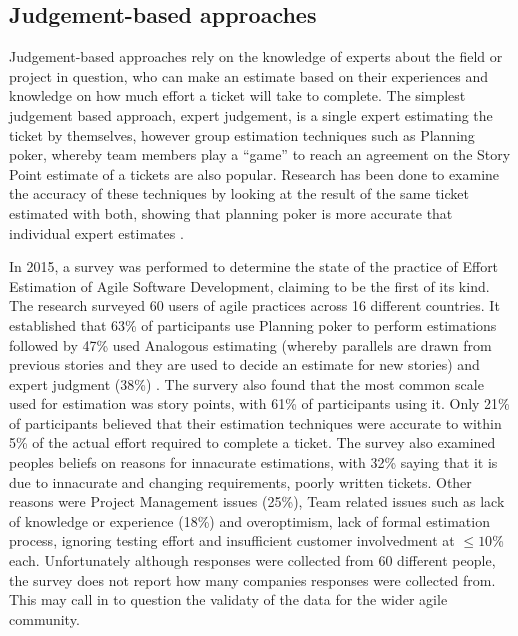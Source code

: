 \documentclass{UoYCSproject}
\begin{document}
    \subsection{Judgement-based approaches}
    \label{subsec:judgement-based-approaches}

    Judgement-based approaches rely on the knowledge of experts about the field or project in question, who can make an estimate based on their experiences and knowledge on how much effort a ticket will take to complete.
    The simplest judgement based approach, expert judgement, is a single expert estimating the ticket by themselves, however group estimation techniques such as Planning poker, whereby team members play a “game” to reach an agreement on the Story Point estimate of a tickets are also popular.
    Research has been done to examine the accuracy of these techniques by looking at the result of the same ticket estimated with both, showing that planning poker is more accurate that individual expert estimates \cite{MAHNIC20122086, RashidSCE}. \par
    In 2015, a survey was performed to determine the state of the practice of Effort Estimation of Agile Software Development, claiming to be the first of its kind.
    The research surveyed 60 users of agile practices across 16 different countries. It established that 63\% of participants use Planning poker to perform estimations followed by 47\% used Analogous estimating (whereby parallels are drawn from previous stories and they are used to decide an estimate for new stories) and expert judgment (38\%) \cite{effortestimationsurvey}.
    The survery also found that the most common scale used for estimation was story points, with 61\% of participants using it.
    Only 21\% of participants believed that their estimation techniques were accurate to within 5\% of the actual effort required to complete a ticket.
    The survey also examined peoples beliefs on reasons for innacurate estimations, with 32\% saying that it is due to innacurate and changing requirements, poorly written tickets.
    Other reasons were Project Management issues (25\%), Team related issues such as lack of knowledge or experience (18\%) and overoptimism, lack of formal estimation process, ignoring testing effort and insufficient customer involvedment at $\leq 10$\% each.
    Unfortunately although responses were collected from 60 different people, the survey does not report how many companies responses were collected from. This may call in to question the validaty of the data for the wider agile community. \par
\end{document}
